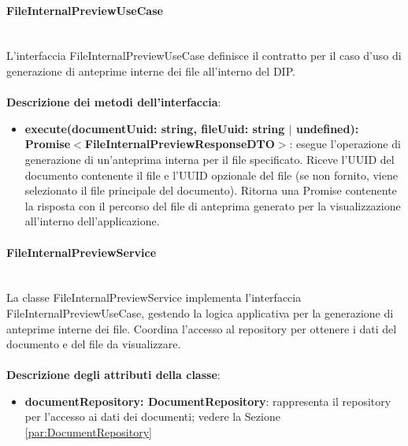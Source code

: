\documentclass[a4paper,12pt]{article}
\begin{document}
{{                \paragraph{FileInternalPreviewUseCase}\label{par:FileInternalPreviewUseCase}\mbox{}\\
                L'interfaccia FileInternalPreviewUseCase definisce il contratto per il caso d'uso di generazione di anteprime interne dei file all'interno del DIP.\\
                \\
              \noindent \textbf{Descrizione dei metodi dell'interfaccia}:
                \begin{itemize}
                    \item \textbf{execute(documentUuid: string, fileUuid: string $|$ undefined):\\ Promise$<$FileInternalPreviewResponseDTO$>$}: esegue l'operazione di generazione di un'anteprima interna per il file specificato. Riceve l'UUID del documento contenente il file e l'UUID opzionale del file (se non fornito, viene selezionato il file principale del documento). Ritorna una Promise contenente la risposta con il percorso del file di anteprima generato per la visualizzazione all’interno dell’applicazione.
                \end{itemize}
                \paragraph{FileInternalPreviewService}\label{par:FileInternalPreviewService}\mbox{}\\
                La classe FileInternalPreviewService implementa l'interfaccia FileInternalPreviewUseCase, gestendo la logica applicativa per la generazione di anteprime interne dei file. Coordina l'accesso al repository per ottenere i dati del documento e del file da visualizzare.\\
                \\
                \textbf{Descrizione degli attributi della classe}:
                \begin{itemize}
                    \item \textbf{documentRepository: DocumentRepository}: rappresenta il repository per l'accesso ai dati dei documenti; vedere la Sezione \ref{par:DocumentRepository}
                \end{itemize}
                
}}
\end{document}
